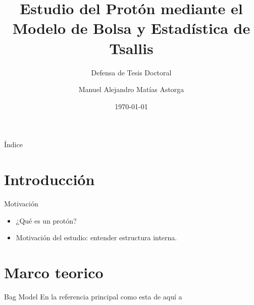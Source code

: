 \documentclass{beamer}
\title{Estudio del Protón mediante el Modelo de Bolsa y Estadística de Tsallis}
\subtitle{Defensa de Tesis Doctoral}
\author{Manuel Alejandro Matías Astorga}
\date{\today}
\institute{Universidad XYZ}
\begin{document}
\maketitle

\begin{frame}{Índice}
  \tableofcontents
\end{frame}

\section{Introducción}
\begin{frame}{Motivación}
  \begin{itemize}
    \item ¿Qué es un protón?
    \item Motivación del estudio: entender estructura interna.
  \end{itemize}
\end{frame}

\section{Marco teorico }

\begin{frame}{Bag Model}
    En la referencia principal como esta de aquí a
\end{frame}

% 
% 
\end{document}
